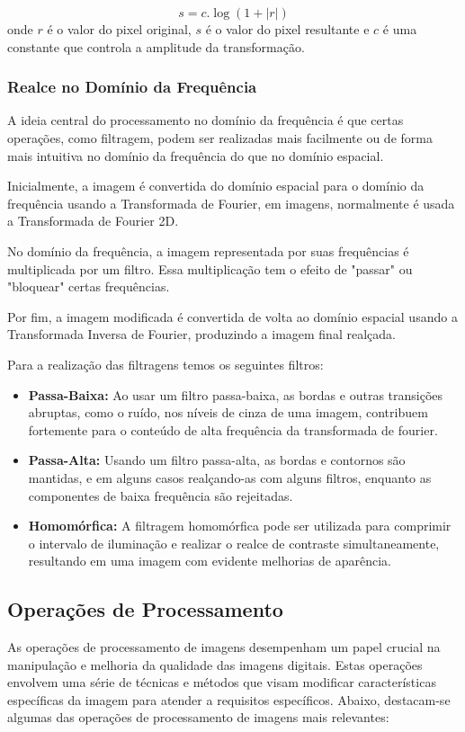 \documentclass[conference]{IEEEtran}
\begin{document}
\begin{equation}
s = c . \log(1 + |r|)
\label{eq:ecl_din}
\end{equation}
onde $r$ é o valor do pixel original, $s$ é o valor do pixel resultante e $c$ é uma constante que 
controla a amplitude da transformação.

\subsubsection{Realce no Domínio da Frequência}
A ideia central do processamento no domínio da frequência é que certas operações, como filtragem, 
podem ser realizadas mais facilmente ou de forma mais intuitiva no domínio da frequência do que no domínio espacial.
\cite{gonzalez2000}

Inicialmente, a imagem é convertida do domínio espacial para o domínio da frequência usando a 
Transformada de Fourier, em imagens, normalmente é usada a Transformada de Fourier 2D.

No domínio da frequência, a imagem representada por suas frequências é multiplicada por um filtro. 
Essa multiplicação tem o efeito de "passar" ou "bloquear" certas frequências.

Por fim, a imagem modificada é convertida de volta ao domínio espacial usando a Transformada Inversa de Fourier, 
produzindo a imagem final realçada.

Para a realização das filtragens temos os seguintes filtros:
\begin{itemize}
    \item {\textbf{Passa-Baixa:}}
    Ao usar um filtro passa-baixa, as bordas e outras transições abruptas, como o ruído, nos níveis de cinza de uma 
    imagem, contribuem fortemente para o conteúdo de alta frequência da transformada de fourier.
    
    \item {\textbf{Passa-Alta:}}
    Usando um filtro passa-alta, as bordas e contornos são mantidas, e em alguns casos realçando-as com alguns 
    filtros, enquanto as componentes de baixa frequência são rejeitadas.
    
    \item {\textbf{Homomórfica:}}
    A filtragem homomórfica pode ser utilizada para comprimir o intervalo de iluminação e realizar o realce de 
    contraste simultaneamente, resultando em uma imagem com evidente melhorias de aparência.
\end{itemize}

\subsection{Operações de Processamento}
As operações de processamento de imagens desempenham um papel crucial na manipulação e melhoria 
da qualidade das imagens digitais. Estas operações envolvem uma série de técnicas e métodos que 
visam modificar características específicas da imagem para atender a requisitos específicos. 
Abaixo, destacam-se algumas das operações de processamento de imagens mais relevantes:
\end{document}
